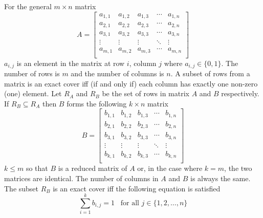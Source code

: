 For the general $m \times n$ matrix
\[
A =
\left[
\begin{array}{ccccc}
	a_{1,1} & a_{1,2} & a_{1,3} & \cdots & a_{1,n} \\
	a_{2,1} & a_{2,2} & a_{2,3} & \cdots & a_{2,n} \\
	a_{3,1} & a_{3,2} & a_{3,3} & \cdots & a_{3,n} \\
	\vdots  & \vdots  & \vdots  & \ddots & \vdots  \\
	a_{m,1} & a_{m,2} & a_{m,3} & \cdots & a_{m,n} \\
\end{array}
\right]
\]
$a_{i,j}$ is an element in the matrix at row $i$, column $j$ where $a_{i,j} \in \{0,1\}$.
The number of rows is $m$ and the number of columns is $n$.
A subset of rows from a matrix is an exact cover iff (if and only if) each column has exactly one non-zero (one) element.
Let $R_A$ and $R_B$ be the set of rows in matrix $A$ and $B$ respectively.
If $R_B \subseteq R_A$ then $B$ forms the following $k \times n$ matrix
\[
	B =
	\left[
	\begin{array}{ccccc}
		b_{1,1} & b_{1,2} & b_{1,3} & \cdots & b_{1,n} \\
		b_{2,1} & b_{2,2} & b_{2,3} & \cdots & b_{2,n} \\
		b_{3,1} & b_{3,2} & b_{3,3} & \cdots & b_{3,n} \\
		\vdots  & \vdots  & \vdots  & \ddots & \vdots  \\
		b_{k,1} & b_{k,2} & b_{k,3} & \cdots & b_{k,n} \\
	\end{array}
	\right]
\]
$k \leq m$ so that $B$ is a reduced matrix of $A$ or, in the case where $k = m$, the two matrices are identical.
The number of columns in $A$ and $B$ is always the same.
The subset $R_B$ is an exact cover iff the following equation is satisfied
\[
	\sum_{i = 1}^{k} b_{i,j} = 1 \;\;\; \text{for all } j \in \{ 1, 2, \ldots, n \}
\]

